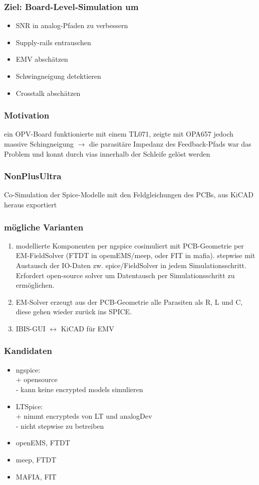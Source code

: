 \documentclass{article}
\begin{document}
\subsubsection*{ Ziel: Board-Level-Simulation um }
\begin{itemize}
	\item SNR in analog-Pfaden zu verbessern
	\item Supply-rails entrauschen
	\item EMV abschätzen
	\item Schwingneigung detektieren
	\item Crosstalk abschätzen
\end{itemize}

\subsubsection*{Motivation} ein OPV-Board funktionierte mit einem TL071, zeigte mit OPA657 jedoch massive Schingneigung $\rightarrow$ die parasitäre Impedanz des Feedback-Pfads war das Problem und konnt durch vias innerhalb der Schleife gelöst werden

\subsubsection*{NonPlusUltra}
	Co-Simulation der Spice-Modelle mit den Feldgleichungen des PCBs, aus KiCAD heraus exportiert


\subsubsection*{mögliche Varianten}
\begin{enumerate}
\item
	modellierte Komponenten per ngspice cosimuliert mit PCB-Geometrie per EM-FieldSolver (FTDT in opemEMS/meep, oder FIT in mafia). stepwise mit Austausch der IO-Daten zw. spice/FieldSolver in jedem Simulationsschritt. Erfordert open-source solver um Datentausch per Simulationsschritt zu ermöglichen.
	
\item
	EM-Solver erzeugt aus der PCB-Geometrie alle Parasiten als R, L und C, diese gehen wieder zurück ins SPICE.
	
\item	IBIS-GUI $\leftrightarrow$ KiCAD für EMV
\end{enumerate}

\subsubsection*{Kandidaten}
\begin{itemize}
\item ngspice: \\
	+ opensource \\
	- kann keine encrypted models simulieren \\

\item LTSpice: \\
	+ nimmt encrypteds von LT und analogDev \\
	- nicht stepwise zu betreiben \\

\item openEMS, FTDT
\item meep, FTDT
\item MAFIA, FIT
\end{itemize}
\end{document}
